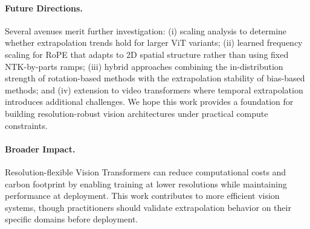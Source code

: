 \paragraph{Future Directions.}
Several avenues merit further investigation: (i) scaling analysis to determine whether
extrapolation trends hold for larger ViT variants; (ii) learned frequency scaling for RoPE
that adapts to 2D spatial structure rather than using fixed NTK-by-parts ramps;
(iii) hybrid approaches combining the in-distribution strength of rotation-based methods with
the extrapolation stability of bias-based methods; and (iv) extension to video transformers
where temporal extrapolation introduces additional challenges. We hope this work provides a
foundation for building resolution-robust vision architectures under practical compute constraints.

\paragraph{Broader Impact.}
Resolution-flexible Vision Transformers can reduce computational costs and carbon footprint by enabling training at lower resolutions while maintaining performance at deployment. This work contributes to more efficient vision systems, though practitioners should validate extrapolation behavior on their specific domains before deployment.